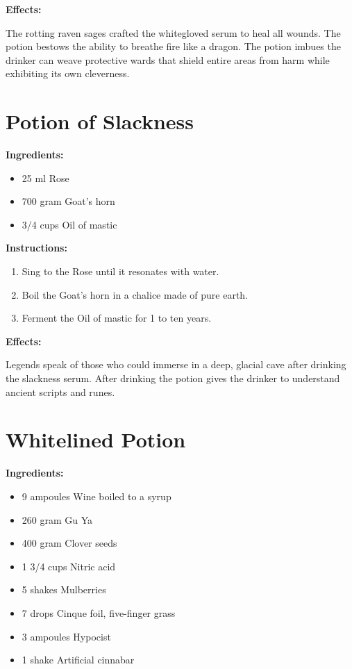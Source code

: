 \documentclass{article}
\begin{document}
\textbf{Effects:}

The rotting raven sages crafted the whitegloved serum to heal all wounds. The potion bestows the ability to breathe fire like a dragon. The potion imbues the drinker can weave protective wards that shield entire areas from harm while exhibiting its own cleverness.

\newpage
\section*{Potion of Slackness}

\textbf{Ingredients:}

\begin{itemize}
  \item 25 ml Rose
  \item 700 gram Goat's horn
  \item 3/4 cups Oil of mastic
\end{itemize}

\textbf{Instructions:}

\begin{enumerate}
  \item Sing to the Rose until it resonates with water.
  \item Boil the Goat's horn in a chalice made of pure earth.
  \item Ferment the Oil of mastic for 1 to ten years.
\end{enumerate}

\textbf{Effects:}

Legends speak of those who could immerse in a deep, glacial cave after drinking the slackness serum. After drinking the potion gives the drinker to understand ancient scripts and runes.

\newpage
\section*{Whitelined Potion}

\textbf{Ingredients:}

\begin{itemize}
  \item 9 ampoules Wine boiled to a syrup
  \item 260 gram Gu Ya
  \item 400 gram Clover seeds
  \item 1 3/4 cups Nitric acid
  \item 5 shakes Mulberries
  \item 7 drops Cinque foil, five-finger grass
  \item 3 ampoules Hypocist
  \item 1 shake Artificial cinnabar
\end{itemize}
\end{document}
